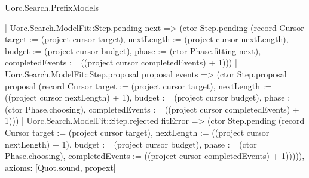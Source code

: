 \begin{lexlean}{Uorc.Search.PrefixModels}
\begin{semanticmodule}
{      | Uorc.Search.ModelFit::Step.pending next => (ctor Step.pending (record Cursor {target := (project cursor target), nextLength := (project cursor nextLength), budget := (project cursor budget), phase := (ctor Phase.fitting next), completedEvents := ((project cursor completedEvents) + 1)}))
      | Uorc.Search.ModelFit::Step.proposal proposal events => (ctor Step.proposal proposal (record Cursor {target := (project cursor target), nextLength := ((project cursor nextLength) + 1), budget := (project cursor budget), phase := (ctor Phase.choosing), completedEvents := ((project cursor completedEvents) + 1)}))
      | Uorc.Search.ModelFit::Step.rejected fitError => (ctor Step.pending (record Cursor {target := (project cursor target), nextLength := ((project cursor nextLength) + 1), budget := (project cursor budget), phase := (ctor Phase.choosing), completedEvents := ((project cursor completedEvents) + 1)})))),
  axioms: [Quot.sound, propext]
}
\end{semanticmodule}
\end{lexlean}
